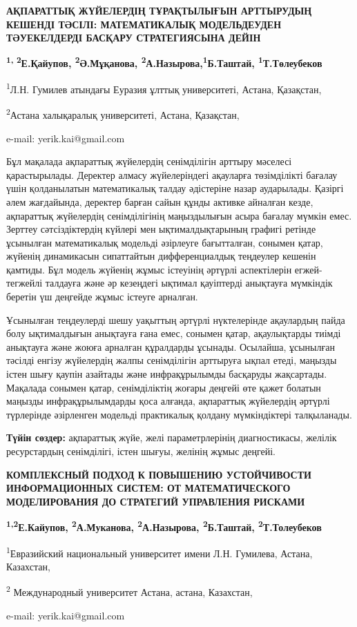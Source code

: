 \begin{center}
{\large\bfseries АҚПАРАТТЫҚ ЖҮЙЕЛЕРДІҢ ТҰРАҚТЫЛЫҒЫН АРТТЫРУДЫҢ КЕШЕНДІ ТӘСІЛІ:
МАТЕМАТИКАЛЫҚ МОДЕЛЬДЕУДЕН ТӘУЕКЕЛДЕРДІ БАСҚАРУ СТРАТЕГИЯСЫНА ДЕЙІН}

{\bfseries \textsuperscript{1, 2}Е.Қайупов\envelope, \textsuperscript{2}Ә.Мұқанова,
\textsuperscript{2}А.Назырова,\textsuperscript{1}Б.Таштай,
\textsuperscript{1}Т.Төлеубеков}

\textsuperscript{1}Л.Н. Гумилев атындағы Еуразия ұлттық университеті,
Астана, Қазақстан,

\textsuperscript{2}Астана халықаралық университеті, Астана, Қазақстан,

e-mail: yerik.kai@gmail.com
\end{center}

Бұл мақалада ақпараттық жүйелердің сенімділігін арттыру мәселесі
қарастырылады. Деректер алмасу жүйелеріндегі ақауларға төзімділікті
бағалау үшін қолданылатын математикалық талдау әдістеріне назар
аударылады. Қазіргі әлем жағдайында, деректер барған сайын құнды активке
айналған кезде, ақпараттық жүйелердің сенімділігінің маңыздылығын асыра
бағалау мүмкін емес. Зерттеу сәтсіздіктердің күйлері мен
ықтималдықтарының графигі ретінде ұсынылған математикалық модельді
әзірлеуге бағытталған, сонымен қатар, жүйенің динамикасын сипаттайтын
дифференциалдық теңдеулер кешенін қамтиды. Бұл модель жүйенің жұмыс
істеуінің әртүрлі аспектілерін егжей-тегжейлі талдауға және әр кезеңдегі
ықтимал қауіптерді анықтауға мүмкіндік беретін үш деңгейде жұмыс істеуге
арналған.

Ұсынылған теңдеулерді шешу уақыттың әртүрлі нүктелерінде ақаулардың
пайда болу ықтималдығын анықтауға ғана емес, сонымен қатар, ақаулықтарды
тиімді анықтауға және жоюға арналған құралдарды ұсынады. Осылайша,
ұсынылған тәсілді енгізу жүйелердің жалпы сенімділігін арттыруға ықпал
етеді, маңызды істен шығу қаупін азайтады және инфрақұрылымды басқаруды
жақсартады. Мақалада сонымен қатар, сенімділіктің жоғары деңгейі өте
қажет болатын маңызды инфрақұрылымдарды қоса алғанда, ақпараттық
жүйелердің әртүрлі түрлерінде әзірленген модельді практикалық қолдану
мүмкіндіктері талқыланады.

{\bfseries Түйін сөздер:} ақпараттық жүйе, желі параметрлерінің
диагностикасы, желілік ресурстардың сенімділігі, істен шығуы, желінің
жұмыс деңгейі.

\begin{center}
{\large\bfseries КОМПЛЕКСНЫЙ ПОДХОД К ПОВЫШЕНИЮ УСТОЙЧИВОСТИ ИНФОРМАЦИОННЫХ
СИСТЕМ: ОТ МАТЕМАТИЧЕСКОГО МОДЕЛИРОВАНИЯ ДО СТРАТЕГИЙ УПРАВЛЕНИЯ
РИСКАМИ}

{\bfseries \textsuperscript{1,2}Е.Кайупов\envelope, \textsuperscript{2}А.Муканова,
\textsuperscript{2}А.Назырова, \textsuperscript{2}Б.Таштай,
\textsuperscript{2}Т.Толеубеков}

\textsuperscript{1}Евразийский национальный университет имени Л.Н.
Гумилева, Астана, Казахстан,

\textsuperscript{2} Международный университет Астана, астана, Казахстан,

e-mail: yerik.kai@gmail.com
\end{center}

